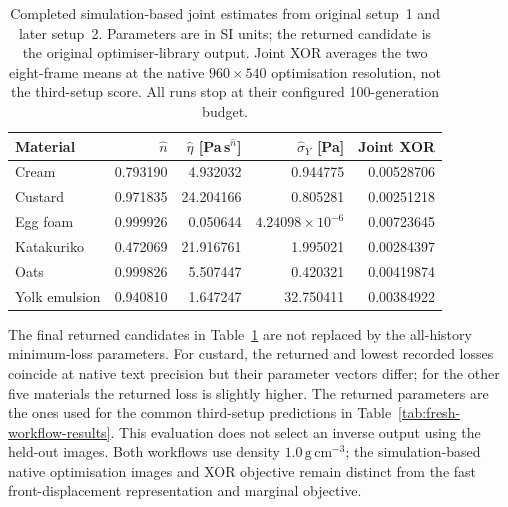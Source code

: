 \begin{table}[!htbp]
\centering\small
\setlength{\tabcolsep}{7pt}
\caption{Completed simulation-based joint estimates from original
setup~1 and later setup~2. Parameters are in SI units; the
returned candidate is the original optimiser-library output.
Joint XOR averages the two eight-frame means at the native
$960\times540$ optimisation resolution, not the third-setup score.
All runs stop at their configured 100-generation budget.}
\label{tab:freshness-old-joint}
\begin{tabular}{@{}lrrrr@{}}
\toprule
Material & $\hat n$ & $\hat\eta$ [Pa\,s$^{\hat n}$]
 & $\hat\sigma_Y$ [Pa] & Joint XOR \\
\midrule
Cream & 0.793190 & 4.932032 & 0.944775 & 0.00528706 \\
Custard & 0.971835 & 24.204166 & 0.805281 & 0.00251218 \\
Egg foam & 0.999926 & 0.050644 & $4.24098\!\times\!10^{-6}$ & 0.00723645 \\
Katakuriko & 0.472069 & 21.916761 & 1.995021 & 0.00284397 \\
Oats & 0.999826 & 5.507447 & 0.420321 & 0.00419874 \\
Yolk emulsion & 0.940810 & 1.647247 & 32.750411 & 0.00384922 \\
\bottomrule
\end{tabular}
\end{table}

The final returned candidates in Table~\ref{tab:freshness-old-joint}
are not replaced by the all-history minimum-loss parameters. For
custard, the returned and lowest recorded losses coincide at native
text precision but their parameter vectors differ; for the other
five materials the returned loss is slightly higher. The returned
parameters are the ones used for the common third-setup predictions
in Table~\ref{tab:fresh-workflow-results}. This evaluation does not
select an inverse output using the held-out images. Both workflows
use density $1.0\,\mathrm{g\,cm}^{-3}$; the simulation-based native
optimisation images and XOR objective remain distinct from the fast
front-displacement representation and marginal objective.

